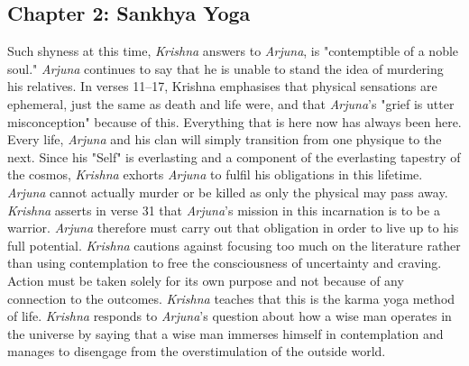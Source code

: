 \documentclass[runningheads]{llncs}
\begin{document}
\subsection{Chapter 2: Sankhya Yoga}
Such shyness at this time, \textit{Krishna} answers to \textit{Arjuna}, is "contemptible of a noble soul." \textit{Arjuna} continues to say that he is unable to stand the idea of murdering his relatives. In verses 11–17, Krishna emphasises that physical sensations are ephemeral, just the same as death and life were, and that \textit{Arjuna}'s "grief is utter misconception" because of this. Everything that is here now has always been here. Every life, \textit{Arjuna} and his clan will simply transition from one physique to the next. Since his "Self" is everlasting and a component of the everlasting tapestry of the cosmos, \textit{Krishna} exhorts \textit{Arjuna} to fulfil his obligations in this lifetime. \textit{Arjuna} cannot actually murder or be killed as only the physical may pass away. \textit{Krishna} asserts in verse 31 that \textit{Arjuna}'s mission in this incarnation is to be a warrior. \textit{Arjuna} therefore must carry out that obligation in order to live up to his full potential. \textit{Krishna} cautions against focusing too much on the literature rather than using contemplation to free the consciousness of uncertainty and craving. Action must be taken solely for its own purpose and not because of any connection to the outcomes. \textit{Krishna} teaches that this is the karma yoga method of life. \textit{Krishna} responds to \textit{Arjuna}'s question about how a wise man operates in the universe by saying that a wise man immerses himself in contemplation and manages to disengage from the overstimulation of the outside world.
\end{document}

